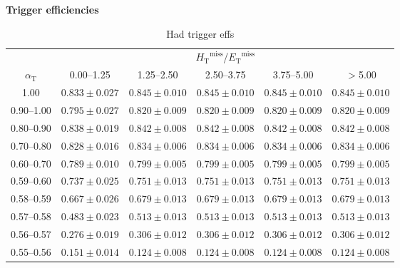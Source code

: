 \documentclass[portrait,a4paper]{article}
\begin{document}
\renewcommand{\arraystretch}{1.3}
\newcommand\AlphaT{\ensuremath{\alpha_{\textrm{T}}}}
\newcommand\HT{\ensuremath{H_{\textrm{T}}}}
\newcommand\ET{\ensuremath{E_{\textrm{T}}}}
\newcommand\MHT{\ensuremath{\HT^{\textrm{miss}}}}
\newcommand\MET{\ensuremath{\ET^{\textrm{miss}}}}
\newcommand\stat{\ensuremath{{\,\textrm{(stat)}\,}}}
\newcommand\syst{\ensuremath{{\,\textrm{(syst)}\,}}}
\newcommand{\fixedpoint}[5]{\ensuremath{#1^{+#2}_{-#3}{}^{+#4}_{-#5}}}
\newcommand{\scientific}[6]{\ensuremath{(#2^{+#3}_{-#4}{}^{+#5}_{-#6})\cdot10^{#1}}}
\newcommand{\zero}{\entry{0}{0}{0}{0}{0}}

\newpage

\centerline{\LARGE\bf Trigger efficiencies}

\begin{table}[h!]
\centering
\scriptsize
\caption{Had trigger effs}
\label{tab:test}
\begin{tabular}{cccccc}
\hline
& \multicolumn{5}{c}{\MHT/\MET} \\[0.1cm]
\cline{2-6}
\AlphaT & 0.00--1.25 & 1.25--2.50 & 2.50--3.75 & 3.75--5.00 & $>$5.00 \\
\hline
1.00 & $0.833 \pm 0.027$ & $0.845 \pm 0.010$ & $0.845 \pm 0.010$ & $0.845 \pm 0.010$ & $0.845 \pm 0.010$ \\
0.90--1.00 & $0.795 \pm 0.027$ & $0.820 \pm 0.009$ & $0.820 \pm 0.009$ & $0.820 \pm 0.009$ & $0.820 \pm 0.009$ \\
0.80--0.90 & $0.838 \pm 0.019$ & $0.842 \pm 0.008$ & $0.842 \pm 0.008$ & $0.842 \pm 0.008$ & $0.842 \pm 0.008$ \\
0.70--0.80 & $0.828 \pm 0.016$ & $0.834 \pm 0.006$ & $0.834 \pm 0.006$ & $0.834 \pm 0.006$ & $0.834 \pm 0.006$ \\
0.60--0.70 & $0.789 \pm 0.010$ & $0.799 \pm 0.005$ & $0.799 \pm 0.005$ & $0.799 \pm 0.005$ & $0.799 \pm 0.005$ \\
0.59--0.60 & $0.737 \pm 0.025$ & $0.751 \pm 0.013$ & $0.751 \pm 0.013$ & $0.751 \pm 0.013$ & $0.751 \pm 0.013$ \\
0.58--0.59 & $0.667 \pm 0.026$ & $0.679 \pm 0.013$ & $0.679 \pm 0.013$ & $0.679 \pm 0.013$ & $0.679 \pm 0.013$ \\
0.57--0.58 & $0.483 \pm 0.023$ & $0.513 \pm 0.013$ & $0.513 \pm 0.013$ & $0.513 \pm 0.013$ & $0.513 \pm 0.013$ \\
0.56--0.57 & $0.276 \pm 0.019$ & $0.306 \pm 0.012$ & $0.306 \pm 0.012$ & $0.306 \pm 0.012$ & $0.306 \pm 0.012$ \\
0.55--0.56 & $0.151 \pm 0.014$ & $0.124 \pm 0.008$ & $0.124 \pm 0.008$ & $0.124 \pm 0.008$ & $0.124 \pm 0.008$ \\

\end{tabular}
\end{table}
\end{document}

